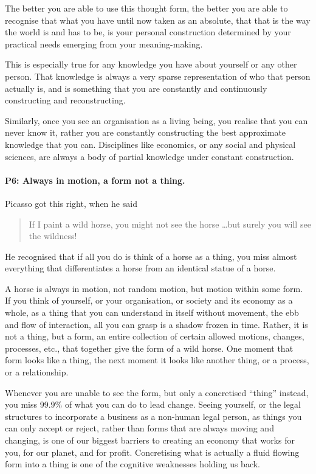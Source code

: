 The better you are able to use this thought form, the better you are able to recognise that what you have until now taken as an absolute, that that is the way the world is and has to be, is your personal construction determined by your practical needs emerging from your meaning\hyp{}making. 


This is especially true for any knowledge you have about yourself or any other person. That knowledge is always a very sparse representation of who that person actually is, and is something that you are constantly and continuously constructing and reconstructing. 


Similarly, once you see an organisation as a living being, you realise that you can never know it, rather you are constantly constructing the best approximate knowledge that you can. Disciplines like economics, or any social and physical sciences, are always a body of partial knowledge under constant construction.
\paragraph{\textbf{P6: Always in motion, a form not a thing.}}
Picasso  got this right, when he said 
\begin{quote} 
If I paint a wild horse, you might not see the horse \ldots but surely you will see the wildness! 
\end{quote} 
He recognised that if all you do is think of a horse as a thing, you miss almost everything that differentiates a horse from an identical statue of a horse.


A horse is always in motion, not random motion, but motion within some form. If you think of yourself, or your organisation, or society and its economy as a whole, as a thing that you can understand in itself without movement, the ebb and flow of interaction, all you can grasp is a shadow frozen in time. Rather, it is not a thing, but a form, an entire collection of certain allowed motions, changes, processes, etc., that together give the form of a wild horse. One moment that form looks like a thing, the next moment it looks like another thing, or a process, or a relationship.


Whenever you are unable to see the form, but only a concretised “thing” instead, you miss 99.9\% of what you can do to lead change. Seeing yourself, or the legal structures to incorporate a business as a non-human legal person, as things you can only accept or reject, rather than forms that are always moving and changing, is one of our biggest barriers to creating an economy that works for you, for our planet, and for profit. Concretising what is actually a fluid flowing form into a thing is one of the cognitive weaknesses holding us back.
